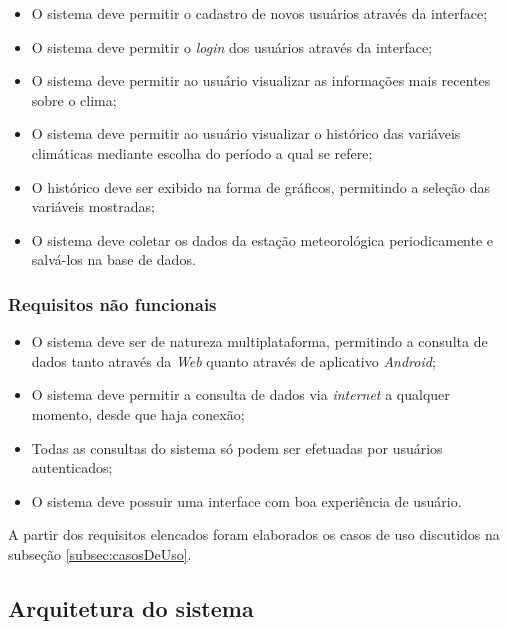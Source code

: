 \begin{itemize}
    \item O sistema deve permitir o cadastro de novos usuários através da interface;
    
    \item O sistema deve permitir o \textit{login} dos usuários através da interface;

    \item O sistema deve permitir ao usuário visualizar as informações mais recentes sobre o clima;

    \item O sistema deve permitir ao usuário visualizar o histórico das variáveis climáticas mediante escolha do período a qual se refere;

	\item O histórico deve ser exibido na forma de gráficos, permitindo a seleção das variáveis mostradas;
	
	\item O sistema deve coletar os dados da estação meteorológica periodicamente e salvá-los na base de dados.
\end{itemize}

\subsubsection{Requisitos não funcionais}

\begin{itemize}
    \item O sistema deve ser de natureza multiplataforma, permitindo a consulta de dados tanto através da \textit{Web} quanto através de aplicativo \textit{Android};
    
    \item O sistema deve permitir a consulta de dados via \textit{internet} a qualquer momento, desde que haja conexão;

    \item Todas as consultas do sistema só podem ser efetuadas por usuários autenticados;

    \item O sistema deve possuir uma interface com boa experiência de usuário.

\end{itemize}

A partir dos requisitos elencados foram elaborados os casos de uso discutidos na subseção \ref{subsec:casosDeUso}.

\subsection{Arquitetura do sistema}


